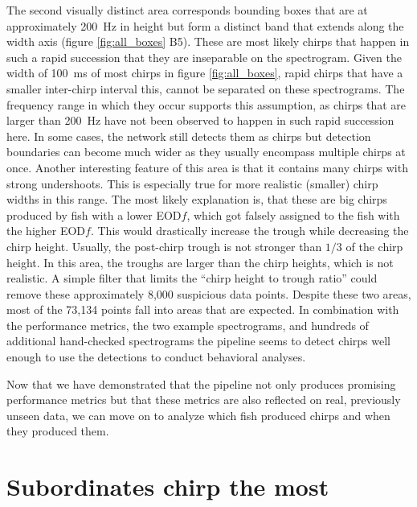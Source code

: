 The second visually distinct area corresponds bounding boxes that are at
approximately \SI{200}{\hertz} in height but form a distinct band that extends
along the width axis (figure \ref{fig:all_boxes} B5). These are most likely
chirps that happen in such a rapid succession that they are inseparable on the
spectrogram. Given the width of \SI{100}{\milli\second} of most chirps in
figure \ref{fig:all_boxes}, rapid chirps that have a smaller inter-chirp
interval this, cannot be separated on these spectrograms. The frequency range
in which they occur supports this assumption, as chirps that are larger than
\SI{200}{\hertz} have not been observed to happen in such rapid succession
here. In some cases, the network still detects them as chirps but detection
boundaries can become much wider as they usually encompass multiple chirps at
once. Another interesting feature of this area is that it contains many chirps
with strong undershoots. This is especially true for more realistic (smaller)
chirp widths in this range. The most likely explanation is, that these are big
chirps produced by fish with a lower EOD$f$, which got falsely assigned to the
fish with the higher EOD$f$. This would drastically increase the trough while
decreasing the chirp height. Usually, the post-chirp trough is not stronger
than $1/3$ of the chirp height. In this area, the troughs are larger than the
chirp heights, which is not realistic. A simple filter that limits the
\enquote{chirp height to trough ratio} could remove these approximately 8,000
suspicious data points. Despite these two areas, most of the 73,134 points fall
into areas that are expected. In combination with the performance metrics, the
two example spectrograms, and hundreds of additional hand-checked spectrograms
the pipeline seems to detect chirps well enough to use the detections to
conduct behavioral analyses.

Now that we have demonstrated that the pipeline not only produces promising
performance metrics but that these metrics are also reflected on real,
previously unseen data, we can move on to analyze which fish produced chirps
and when they produced them.

\section{Subordinates chirp the most}

